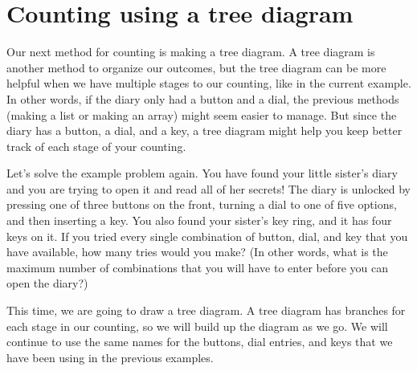 \documentclass{ximera}
\begin{document}
\section{Counting using a tree diagram}
Our next method for counting is making a tree diagram. A tree diagram is another method to organize our outcomes, but the tree diagram can be more helpful when we have multiple stages to our counting, like in the current example. In other words, if the diary only had a button and a dial, the previous methods (making a list or making an array) might seem easier to manage. But since the diary has a button, a dial, and a key, a tree diagram might help you keep better track of each stage of your counting.
\begin{example}
Let's solve the example problem again. You have found your little sister's diary and you are trying to open it and read all of her secrets! The diary is unlocked by pressing one of three buttons on the front, turning a dial to one of five options, and then inserting a key. You also found your sister's key ring, and it has four keys on it. If you tried every single combination of button, dial, and key that you have available, how many tries would you make? (In other words, what is the maximum number of combinations that you will have to enter before you can open the diary?)

This time, we are going to draw a tree diagram. A tree diagram has branches for each stage in our counting, so we will build up the diagram as we go. We will continue to use the same names for the buttons, dial entries, and keys that we have been using in the previous examples.


\end{example}
\end{document}
